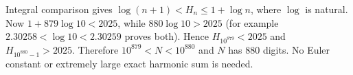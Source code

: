 Integral comparison gives $\log(n+1)<H_n\le1+\log n$, where $\log$ is natural. Now $1+879\log10<2025$, while $880\log10>2025$ (for example $2.30258<\log10<2.30259$ proves both). Hence $H_{10^{879}}<2025$ and $H_{10^{880}-1}>2025$. Therefore $10^{879}<N<10^{880}$ and $N$ has $\boxed{880}$ digits. No Euler constant or extremely large exact harmonic sum is needed.
